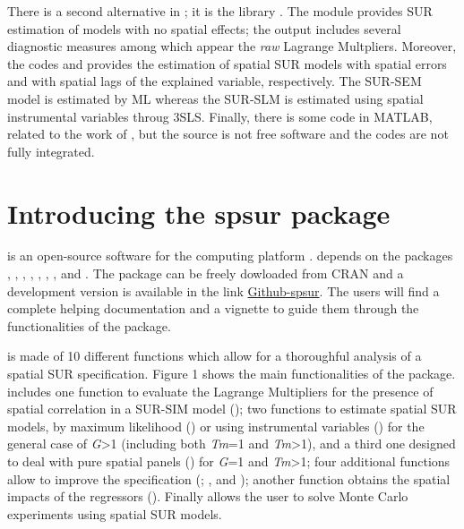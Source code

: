 \documentclass[article]{jss}
\begin{document}
There is a second alternative in ; it is the library  \citep{Rey2007}. The module  provides SUR estimation of models with no spatial effects; the output includes several diagnostic measures among which appear the \emph{raw} Lagrange Multpliers. Moreover, the codes  and  provides the estimation of spatial SUR models with spatial errors and with spatial lags of the explained variable, respectively. The SUR-SEM model is estimated by ML whereas the SUR-SLM is estimated using spatial instrumental variables throug 3SLS. Finally, there is some code in MATLAB, related to the work of \citep{Lopez2014}, but the source is not free software and the codes are not fully integrated.

\hypertarget{intro-spsur}{%
\section{Introducing the spsur package}\label{intro-spsur}}

 is an open-source software for the  computing platform \citep{R2018}.  depends on the packages , , , , , , ,  and . The package can be freely dowloaded from CRAN and a development version is available in the link \href{https://www.github.com/rominsal/spSUR}{Github-spsur}.
The users will find a complete helping documentation and a vignette to guide them through the functionalities of the package.

 is made of 10 different functions which allow for a thoroughful analysis of a spatial SUR specification. Figure 1 shows the main functionalities of the package.  includes one function to evaluate the Lagrange Multipliers for the presence of spatial correlation in a SUR-SIM model (); two functions to estimate spatial SUR models, by maximum likelihood () or using instrumental variables () for the general case of \emph{G}\textgreater{}1 (including both \emph{Tm}=1 and \emph{Tm}\textgreater{}1), and a third one designed to deal with pure spatial panels () for \emph{G}=1 and \emph{Tm}\textgreater{}1; four additional functions allow to improve the specification (; ,  and ); another function obtains the spatial impacts of the regressors (). Finally  allows the user to solve Monte Carlo experiments using spatial SUR models.
\end{document}
